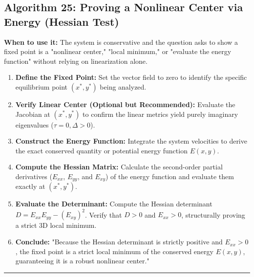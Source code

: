 \documentclass[11pt, a4paper]{report}
\begin{document}
\subsection*{Algorithm 25: Proving a Nonlinear Center via Energy (Hessian Test)}
\textbf{When to use it:} The system is conservative and the question asks to show a fixed point is a "nonlinear center," "local minimum," or "evaluate the energy function" without relying on linearization alone.
\begin{enumerate}[label=\textbf{\arabic*.}]
    \item \textbf{Define the Fixed Point:} Set the vector field to zero to identify the specific equilibrium point $(x^*, y^*)$ being analyzed.
    \item \textbf{Verify Linear Center (Optional but Recommended):} Evaluate the Jacobian at $(x^*, y^*)$ to confirm the linear metrics yield purely imaginary eigenvalues ($\tau = 0, \Delta > 0$).
    \item \textbf{Construct the Energy Function:} Integrate the system velocities to derive the exact conserved quantity or potential energy function $E(x,y)$.
    \item \textbf{Compute the Hessian Matrix:} Calculate the second-order partial derivatives ($E_{xx}$, $E_{yy}$, and $E_{xy}$) of the energy function and evaluate them exactly at $(x^*, y^*)$.
    \item \textbf{Evaluate the Determinant:} Compute the Hessian determinant $D = E_{xx}E_{yy} - (E_{xy})^2$. Verify that $D > 0$ and $E_{xx} > 0$, structurally proving a strict 3D local minimum.
    \item \textbf{Conclude:} "Because the Hessian determinant is strictly positive and $E_{xx} > 0$, the fixed point is a strict local minimum of the conserved energy $E(x,y)$, guaranteeing it is a robust nonlinear center."
\end{enumerate}
\vspace{1em}
\noindent\rule{\textwidth}{0.4pt}
\vspace{1em}
\end{document}
